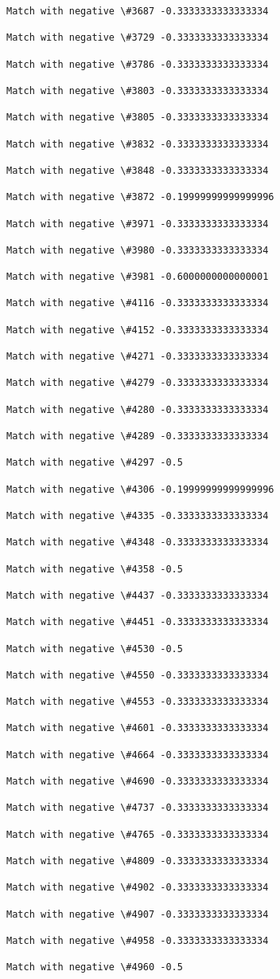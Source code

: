 \documentclass[11pt]{article}
\begin{document}
\begin{Verbatim}[commandchars=\\\{\}]
Match with negative \#3687 -0.3333333333333334

Match with negative \#3729 -0.3333333333333334

Match with negative \#3786 -0.3333333333333334

Match with negative \#3803 -0.3333333333333334

Match with negative \#3805 -0.3333333333333334

Match with negative \#3832 -0.3333333333333334

Match with negative \#3848 -0.3333333333333334

Match with negative \#3872 -0.19999999999999996

Match with negative \#3971 -0.3333333333333334

Match with negative \#3980 -0.3333333333333334

Match with negative \#3981 -0.6000000000000001

Match with negative \#4116 -0.3333333333333334

Match with negative \#4152 -0.3333333333333334

Match with negative \#4271 -0.3333333333333334

Match with negative \#4279 -0.3333333333333334

Match with negative \#4280 -0.3333333333333334

Match with negative \#4289 -0.3333333333333334

Match with negative \#4297 -0.5

Match with negative \#4306 -0.19999999999999996

Match with negative \#4335 -0.3333333333333334

Match with negative \#4348 -0.3333333333333334

Match with negative \#4358 -0.5

Match with negative \#4437 -0.3333333333333334

Match with negative \#4451 -0.3333333333333334

Match with negative \#4530 -0.5

Match with negative \#4550 -0.3333333333333334

Match with negative \#4553 -0.3333333333333334

Match with negative \#4601 -0.3333333333333334

Match with negative \#4664 -0.3333333333333334

Match with negative \#4690 -0.3333333333333334

Match with negative \#4737 -0.3333333333333334

Match with negative \#4765 -0.3333333333333334

Match with negative \#4809 -0.3333333333333334

Match with negative \#4902 -0.3333333333333334

Match with negative \#4907 -0.3333333333333334

Match with negative \#4958 -0.3333333333333334

Match with negative \#4960 -0.5


    \end{Verbatim}
\end{document}
